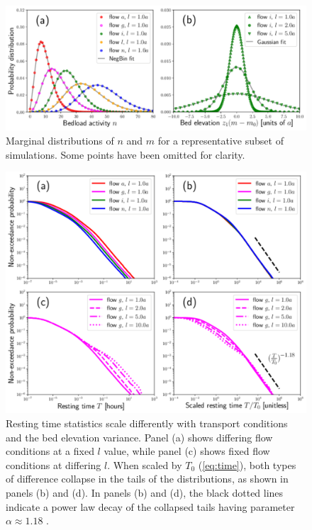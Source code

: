 \documentclass[draft]{agujournal2018}
\begin{document}
\begin{figure}[h!]
	\centering
	\includegraphics[width=\linewidth,keepaspectratio]{./figures/montage2.pdf}
	\caption{Marginal distributions of $n$ and $m$ for a representative subset of simulations. Some points have been omitted for clarity.}
	\label{fig:pdfs}
\end{figure}

\begin{figure}[h!]
	\includegraphics[width=\linewidth,keepaspectratio]{./figures/montage1.pdf}
	\caption{Resting time statistics scale differently with transport conditions and the bed elevation variance. Panel (a) shows differing flow conditions at a fixed $l$ value, while panel (c) shows fixed flow conditions at differing $l$. When scaled by $T_0$ (\ref{eq:time}), both types of difference collapse in the tails of the distributions, as shown in panels (b) and (d). In panels (b) and (d), the black dotted lines indicate a power law decay of the collapsed tails having parameter $\alpha\approx1.18$ .}
	\label{fig:cdfs}
\end{figure}
\end{document}
